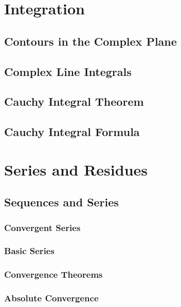 \newpage
\section{Integration}

\subsection{Contours in the Complex Plane}

\subsection{Complex Line Integrals}

\subsection{Cauchy Integral Theorem}

\subsection{Cauchy Integral Formula}


\newpage
\section{Series and Residues}

\subsection{Sequences and Series}

\subsubsection{Convergent Series}

\subsubsection{Basic Series}

\subsubsection{Convergence Theorems}

\subsubsection{Absolute Convergence}


